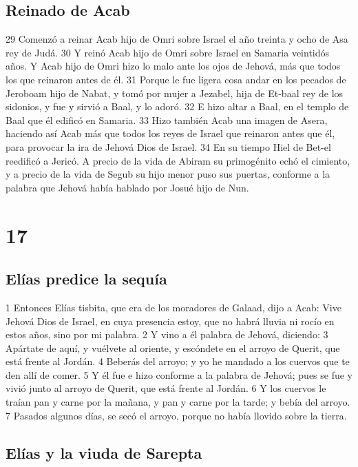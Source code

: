 \section*{Reinado de Acab}

29 Comenzó a reinar Acab hijo de Omri sobre Israel el año treinta y ocho de Asa rey de Judá.
30 Y reinó Acab hijo de Omri sobre Israel en Samaria veintidós años. Y Acab hijo de Omri hizo lo malo ante los ojos de Jehová, más que todos los que reinaron antes de él.
31 Porque le fue ligera cosa andar en los pecados de Jeroboam hijo de Nabat, y tomó por mujer a Jezabel, hija de Et-baal rey de los sidonios, y fue y sirvió a Baal, y lo adoró.
32 E hizo altar a Baal, en el templo de Baal que él edificó en Samaria.
33 Hizo también Acab una imagen de Asera, haciendo así Acab más que todos los reyes de Israel que reinaron antes que él, para provocar la ira de Jehová Dios de Israel.
34 En su tiempo Hiel de Bet-el reedificó a Jericó. A precio de la vida de Abiram su primogénito echó el cimiento, y a precio de la vida de Segub su hijo menor puso sus puertas, conforme a la palabra que Jehová había hablado por Josué hijo de Nun. 

\chapter{17}

\section*{Elías predice la sequía}

1 Entonces Elías tisbita, que era de los moradores de Galaad, dijo a Acab: Vive Jehová Dios de Israel, en cuya presencia estoy, que no habrá lluvia ni rocío en estos años, sino por mi palabra. 
2 Y vino a él palabra de Jehová, diciendo:
3 Apártate de aquí, y vuélvete al oriente, y escóndete en el arroyo de Querit, que está frente al Jordán.
4 Beberás del arroyo; y yo he mandado a los cuervos que te den allí de comer.
5 Y él fue e hizo conforme a la palabra de Jehová; pues se fue y vivió junto al arroyo de Querit, que está frente al Jordán.
6 Y los cuervos le traían pan y carne por la mañana, y pan y carne por la tarde; y bebía del arroyo. 
7 Pasados algunos días, se secó el arroyo, porque no había llovido sobre la tierra.

\section*{Elías y la viuda de Sarepta}

